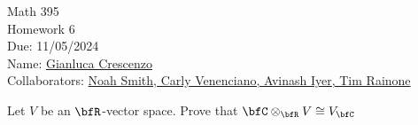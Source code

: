 \documentclass[10pt,twoside,openany]{memoir}
\begin{document}
\begin{center}
    { \Large Math 395 \\[0.1in]Homework 6 \\[0.1in]
    Due: 11/05/2024}\\[.25in]
    { Name:} {\underline{Gianluca Crescenzo\hspace*{2in}}}\\[0.15in]
    { Collaborators:} {\underline{Noah Smith, Carly Venenciano, Avinash Iyer, Tim Rainone\hspace*{1in}}} \\
    \end{center}
    \vspace{4pt}
    \begin{exercise}
        Let $V$ be an $\bfR$-vector space. Prove that $\bfC \otimes_\bfR V \cong V_\bfC$
    \end{exercise}
\end{document}
